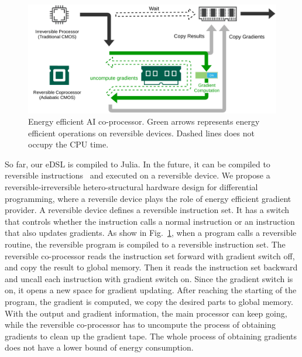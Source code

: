 \documentclass{article}
\newcommand{\<}{\langle}
\renewcommand{\>}{\rangle}
\newcommand{\Fig}[1]{Fig.~\ref{#1}}
\theoremstyle{definition}\newtheorem{definition}{\textit{Definition}}
\begin{document}
\begin{figure}
    \centerline{\includegraphics[width=0.8\columnwidth,trim={0 0cm 0 0cm},clip]{hardware.pdf}}
    \caption{Energy efficient AI co-processor. Green arrows represents energy efficient operations on reversible devices. Dashed lines does not occupy the CPU time.}\label{fig:hardware}
\end{figure}
So far, our eDSL is compiled to Julia.
In the future, it can be compiled to reversible instructions~\cite{Vieri1999} and executed on a reversible device.
We propose a reversible-irreversible hetero-structural hardware design for differential programming, where a reversile device plays the role of energy efficient gradient provider. A reversible device defines a reversible instruction set. It has a switch that controls whether the instruction calls a normal instruction or an instruction that also updates gradients.
As show in \Fig{fig:hardware}, when a program calls a reversible routine, the reversible program is compiled to a reversible instruction set.
The reversible co-processor reads the instruction set forward with gradient switch off, and copy the result to global memory.
Then it reads the instruction set backward and uncall each instruction with gradient switch on.
Since the gradient switch is on, it opens a new space for gradient updating.
After reaching the starting of the program, the gradient is computed, we copy the desired parts to global memory.
With the output and gradient information, the main processor can keep going, while the reversible co-processor has to uncompute the process of obtaining gradients to clean up the gradient tape.
The whole process of obtaining gradients does not have a lower bound of energy consumption.
\end{document}
